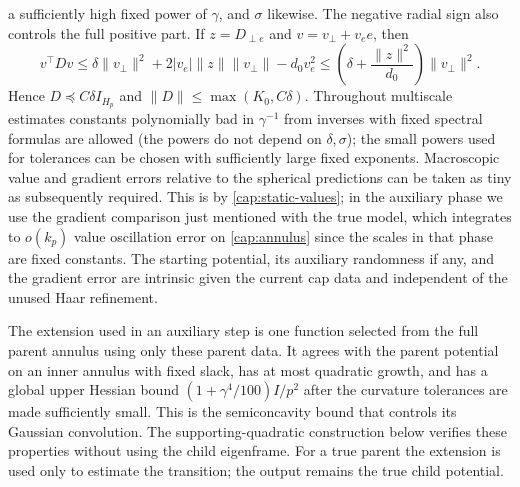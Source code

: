 a sufficiently high fixed power of \(\gamma\), and \(\sigma\) likewise.
The negative radial sign also controls the full positive part. If
\(z=D_{\perp e}\) and \(v=v_\perp+v_e e\), then
\[
 v^\top Dv\le\delta\|v_\perp\|^2
 +2|v_e|\|z\|\|v_\perp\|-d_0v_e^2
 \le\left(\delta+\frac{\|z\|^2}{d_0}\right)\|v_\perp\|^2.
\]
Hence \(D\preceq C\delta I_{H_p}\) and
\(\|D\|\le\max(K_0,C\delta)\).
Throughout multiscale estimates constants polynomially bad in \(\gamma^{-1}\)
from inverses with fixed spectral formulas are allowed (the powers do not
depend on \(\delta,\sigma\)); the small powers used for tolerances can be
chosen with sufficiently large fixed exponents. Macroscopic value and gradient
errors relative to the spherical predictions can be taken as tiny as
subsequently required. This is by \eqref{cap:static-values}; in the auxiliary
phase we use the gradient comparison just mentioned with the true model, which
integrates to \(o(k_p)\) value oscillation error on \eqref{cap:annulus} since
the scales in that phase are fixed constants. The starting potential, its
auxiliary randomness if any, and the gradient error are intrinsic given the
current cap data and independent of the unused Haar refinement.

The extension used in an auxiliary step is one function selected from
the full parent annulus using only these parent data. It agrees with the
parent potential on an inner annulus with fixed slack, has at most
quadratic growth, and has a global upper Hessian bound
$(1+\gamma^4/100)I/p^2$ after the curvature tolerances are made sufficiently
small. This is the semiconcavity bound that controls its Gaussian
convolution. The supporting-quadratic construction below verifies these
properties without using the child eigenframe. For a true parent the
extension is used only to estimate the transition; the output remains
the true child potential.

